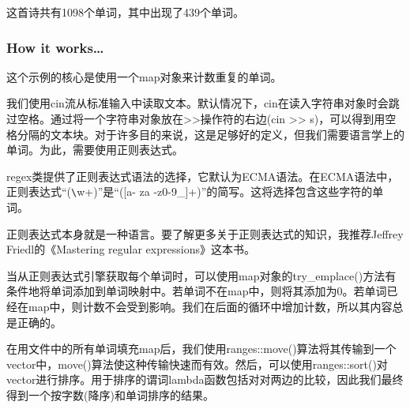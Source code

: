 这首诗共有1098个单词，其中出现了439个单词。

\subsubsection{How it works…}

这个示例的核心是使用一个map对象来计数重复的单词。

我们使用cin流从标准输入中读取文本。默认情况下，cin在读入字符串对象时会跳过空格。通过将一个字符串对象放在>{}>操作符的右边(cin >{}> s)，可以得到用空格分隔的文本块。对于许多目的来说，这是足够好的定义，但我们需要语言学上的单词。为此，需要使用正则表达式。

regex类提供了正则表达式语法的选择，它默认为ECMA语法。在ECMA语法中，正则表达式“(\verb|\|w+)”是“([a- za -z0-9\_]+)”的简写。这将选择包含这些字符的单词。

正则表达式本身就是一种语言。要了解更多关于正则表达式的知识，我推荐Jeffrey Friedl的《Mastering regular expressions》这本书。

当从正则表达式引擎获取每个单词时，可以使用map对象的try\_emplace()方法有条件地将单词添加到单词映射中。若单词不在map中，则将其添加为0。若单词已经在map中，则计数不会受到影响。我们在后面的循环中增加计数，所以其内容总是正确的。

在用文件中的所有单词填充map后，我们使用ranges::move()算法将其传输到一个vector中，move()算法使这种传输快速而有效。然后，可以使用ranges::sort()对vector进行排序。用于排序的谓词lambda函数包括对对两边的比较，因此我们最终得到一个按字数(降序)和单词排序的结果。


